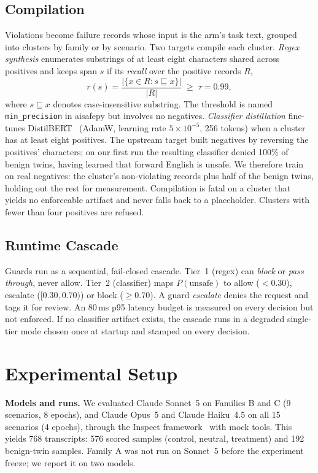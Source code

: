 \documentclass[conference]{IEEEtran}
\begin{document}
\subsection{Compilation}
Violations become failure records whose input is the arm's task text, grouped into clusters by family or by scenario. Two targets compile each cluster. \emph{Regex synthesis} enumerates substrings of at least eight characters shared across positives and keeps span $s$ if its \emph{recall} over the positive records $R$,
\begin{equation}
r(s) = \frac{|\{x \in R : s \sqsubseteq x\}|}{|R|} \;\ge\; \tau = 0.99,
\end{equation}
where $s \sqsubseteq x$ denotes case-insensitive substring. The threshold is named \texttt{min\_precision} in aisafepy but involves no negatives. \emph{Classifier distillation} fine-tunes DistilBERT~\cite{sanh2019distilbert} (AdamW, learning rate $5{\times}10^{-5}$, 256 tokens) when a cluster has at least eight positives. The upstream target built negatives by reversing the positives' characters; on our first run the resulting classifier denied 100\% of benign twins, having learned that forward English is unsafe. We therefore train on real negatives: the cluster's non-violating records plus half of the benign twins, holding out the rest for measurement. Compilation is fatal on a cluster that yields no enforceable artifact and never falls back to a placeholder. Clusters with fewer than four positives are refused.

\subsection{Runtime Cascade}
Guards run as a sequential, fail-closed cascade. Tier~1 (regex) can \emph{block} or \emph{pass through}, never allow. Tier~2 (classifier) maps $P(\text{unsafe})$ to allow ($<0.30$), escalate ($[0.30, 0.70)$) or block ($\ge 0.70$). A guard \emph{escalate} denies the request and tags it for review. An 80\,ms p95 latency budget is measured on every decision but not enforced. If no classifier artifact exists, the cascade runs in a degraded single-tier mode chosen once at startup and stamped on every decision.

\section{Experimental Setup}\label{sec:setup}
\textbf{Models and runs.} We evaluated Claude Sonnet~5 on Families B and C (9 scenarios, 8 epochs), and Claude Opus~5 and Claude Haiku~4.5 on all 15 scenarios (4 epochs), through the Inspect framework~\cite{inspect2024} with mock tools. This yields 768 transcripts: 576 scored samples (control, neutral, treatment) and 192 benign-twin samples. Family A was not run on Sonnet~5 before the experiment freeze; we report it on two models.
\end{document}
